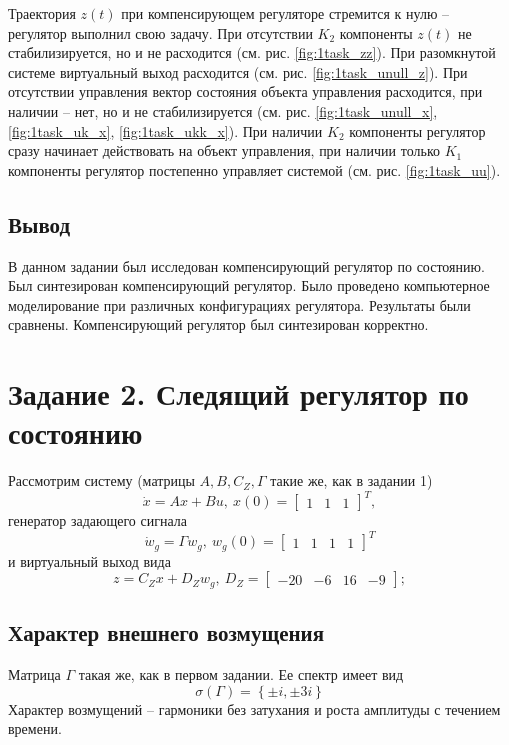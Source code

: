 \documentclass[a4paper, 12pt]{article}
\begin{document}
    \noindent Траектория $z(t)$ при компенсирующем регуляторе стремится к нулю -- регулятор выполнил свою задачу.
    При отсутствии $K_2$ компоненты $z(t)$ не стабилизируется, но и не расходится (см. рис. \ref{fig:1task_zz}). При разомкнутой системе
    виртуальный выход расходится (см. рис. \ref{fig:1task_unull_z}). При отсутствии управления вектор
    состояния объекта управления расходится, при наличии -- нет, но и не стабилизируется (см. рис. \ref{fig:1task_unull_x}, \ref{fig:1task_uk_x}, \ref{fig:1task_ukk_x}).
    При наличии $K_2$ компоненты регулятор сразу начинает действовать на объект управления, при наличии только $K_1$ компоненты
    регулятор постепенно управляет системой (см. рис. \ref{fig:1task_uu}).


    \subsection{Вывод}
    В данном задании был исследован компенсирующий регулятор по состоянию.
    Был синтезирован компенсирующий регулятор. Было проведено компьютерное
    моделирование при различных конфигурациях регулятора.
    Результаты были сравнены. Компенсирующий регулятор был синтезирован корректно.


    \section{Задание 2. Следящий регулятор по состоянию}
    Рассмотрим систему (матрицы $A,B,C_Z,\Gamma$ такие же, как в задании 1)
    $$
    \dot{x}=Ax+Bu,\ x(0)=\begin{bmatrix}
        1 &1 &1
    \end{bmatrix}^T,
    $$
    генератор задающего сигнала
    $$
    \dot{ w}_g=\Gamma w_g,\  w_g(0)=\begin{bmatrix}
        1 &1 &1 &1
    \end{bmatrix}^T
    $$
    и виртуальный выход вида
    $$
    z=C_Zx+D_Z w_g,\ D_Z=\begin{bmatrix}
        -20 &-6 &16 &-9
    \end{bmatrix};
    $$


    \subsection{Характер внешнего возмущения}
    Матрица $\Gamma$ такая же, как в первом задании. Ее спектр имеет вид
    $$
    \sigma\left( \Gamma \right)=\left\{ \pm i, \pm 3i \right\}
    $$
    Характер возмущений -- гармоники без затухания и роста амплитуды с течением времени.
\end{document}
